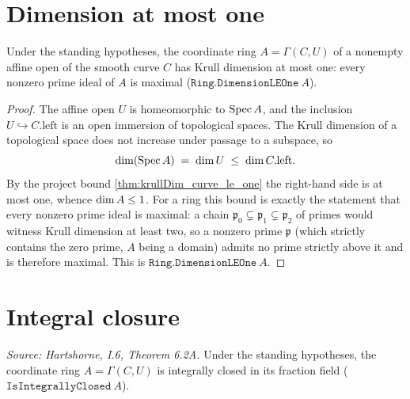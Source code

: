 \section{Dimension at most one}

\begin{lemma}
  \label{lem:chart_dimensionLEOne}
  Under the standing hypotheses, the coordinate ring \(A = \Gamma(C, U)\) of a
  nonempty affine open of the smooth curve \(C\) has Krull dimension at most
  one: every nonzero prime ideal of \(A\) is maximal
  (\(\texttt{Ring.DimensionLEOne}\ A\)).
\end{lemma}

\begin{proof}
  \leanok
  The affine open \(U\) is homeomorphic to \(\operatorname{Spec} A\), and the inclusion
  \(U \hookrightarrow C.\mathrm{left}\) is an open immersion of topological
  spaces. The Krull dimension of a topological space does not increase under
  passage to a subspace, so
  \[
    \dim(\operatorname{Spec} A) \;=\; \dim U \;\le\; \dim C.\mathrm{left}.
  \]
  By the project bound \cref{thm:krullDim_curve_le_one} the right-hand side is
  at most one, whence \(\dim A \le 1\). For a ring this bound is exactly
  the statement that every nonzero prime ideal is maximal: a chain
  \(\mathfrak p_0 \subsetneq \mathfrak p_1 \subsetneq \mathfrak p_2\) of primes
  would witness Krull dimension at least two, so a nonzero prime
  \(\mathfrak p\) (which strictly contains the zero prime, \(A\) being a
  domain) admits no prime strictly above it and is therefore maximal. This is
  \(\texttt{Ring.DimensionLEOne}\ A\).
\end{proof}

\section{Integral closure}

\begin{lemma}
  \label{lem:chart_isIntegrallyClosed}
  \textit{Source: Hartshorne, I.6, Theorem 6.2A.}
  Under the standing hypotheses, the coordinate ring \(A = \Gamma(C, U)\) is
  integrally closed in its fraction field
  (\(\texttt{IsIntegrallyClosed}\ A\)).
\end{lemma}


